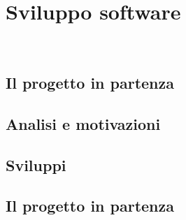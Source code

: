 \chapter{Sviluppo software}
\label{cap:sviluppo software}

\\

\section{Il progetto in partenza}
\section{Analisi e motivazioni}
\section{Sviluppi}
\section{Il progetto in partenza}






